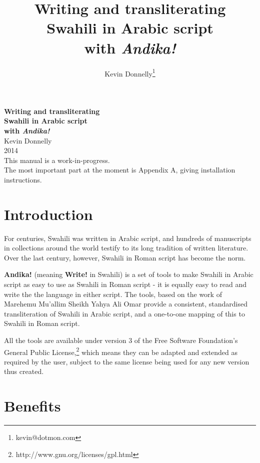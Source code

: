 \documentclass[a4paper,10pt, oneside]{book}
\title{\textbf{Writing and transliterating\\Swahili in Arabic script\\with \textit{Andika!}}}
\author{Kevin Donnelly\thanks{kevin@dotmon.com}}
\date{}
\begin{document}
\frenchspacing


\begin{titlepage}
\begin{center}

{\Huge\textbf{Writing and transliterating\\Swahili in Arabic script\\with \textit{Andika!}}} \\
[3cm]

{\LARGE{Kevin Donnelly}} \\
[3cm]

{\Large{2014}} \\
[10cm]

This manual is a work-in-progress.\\
The most important part at the moment is Appendix A, giving installation instructions.\\
\end{center}
\end{titlepage}


\chapter{Introduction}
\label{s:intro}

For centuries, Swahili was written in Arabic script, and hundreds of manuscripts in collections around the world testify to its long tradition of written literature. Over the last century, however, Swahili in Roman script has become the norm.

\textbf{Andika!} (meaning \textbf{Write!} in Swahili) is a set of tools to make Swahili in Arabic script as easy to use as Swahili in Roman script - it is equally easy to read and write the the language in either script. The tools, based on the work of Marehemu Mu'allim Sheikh Yahya Ali Omar \citep{Omar1997} provide a consistent, standardised transliteration of Swahili in Arabic script, and a one-to-one mapping of this to Swahili in Roman script.

All the tools are available under version 3 of the Free Software Foundation's General Public License,\footnote{http://www.gnu.org/licenses/gpl.html} which means they can be adapted and extended as required by the user, subject to the same license being used for any new version thus created.


\chapter{Benefits}
\label{s:benefits}
\end{document}
